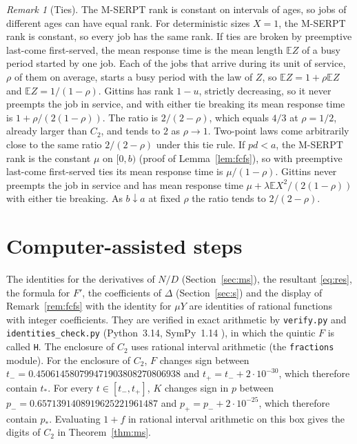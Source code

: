 \documentclass[11pt]{amsart}
\theoremstyle{remark}
\newtheorem{remark}[theorem]{Remark}
\numberwithin{equation}{section}
\newcommand{\E}{\mathbb{E}}
\begin{document}
\begin{remark}[Ties]\label{rem:ties}
The M-SERPT rank is constant on intervals of ages, so jobs of different
ages can have equal rank. For
deterministic sizes $X=1$, the M-SERPT rank is constant, so every job has
the same rank. If ties are broken by preemptive last-come first-served,
the mean response time is the mean length $\E Z$ of a busy period
started by one job. Each of the jobs that arrive during its unit of service,
$\rho$ of them on average, starts a busy period with the law of $Z$, so
$\E Z=1+\rho\E Z$ and $\E Z=1/(1-\rho)$. Gittins has rank $1-u$, strictly decreasing, so it never preempts
the job in service, and with either tie breaking its mean response time is
$1+\rho/(2(1-\rho))$. The ratio is
$2/(2-\rho)$, which equals $4/3$ at $\rho=1/2$, already larger than $C_2$,
and tends to $2$ as $\rho\to1$. Two-point laws come arbitrarily close to
the same ratio $2/(2-\rho)$ under this tie rule. If $pd<a$, the M-SERPT rank is the
constant $\mu$ on $[0,b)$ (proof of Lemma~\ref{lem:fcfs}), so with
preemptive last-come first-served ties its mean response time is
$\mu/(1-\rho)$. Gittins never preempts the job in service and has mean response
time $\mu+\lambda\E X^2/(2(1-\rho))$ with either tie breaking. As $b\downarrow a$ at fixed $\rho$ the
ratio tends to $2/(2-\rho)$.
\end{remark}



\section{Computer-assisted steps}\label{sec:computations}

The identities for the derivatives of $N/D$ (Section~\ref{sec:ms}), the resultant \eqref{eq:res}, the
formula for $F'$, the
coefficients of $\Delta$ (Section~\ref{sec:s}) and the display of Remark~\ref{rem:fcfs} with the identity
for $\mu Y$ are identities of rational functions with integer coefficients. They are verified in exact
arithmetic by \texttt{verify.py} and \texttt{identities\_check.py} (Python~3.14, SymPy~1.14 \cite{SymPy}),
in which the quintic $F$ is called \texttt{H}.
The enclosure of $C_2$ uses rational interval arithmetic (the \texttt{fractions} module). For the enclosure of $C_2$, $F$
changes sign between $t_-=0.450614580799471903808270806938$ and $t_+=t_-+2\cdot10^{-30}$, which
therefore contain $t_*$. For every $t\in[t_-,t_+]$, $K$ changes sign in
$p$ between $p_-=0.6571391408919625221961487$ and $p_+=p_-+2\cdot10^{-25}$, which therefore
contain $p_*$. Evaluating $1+f$ in rational interval arithmetic on this
box gives the digits of $C_2$ in Theorem~\ref{thm:ms}.
\end{document}
